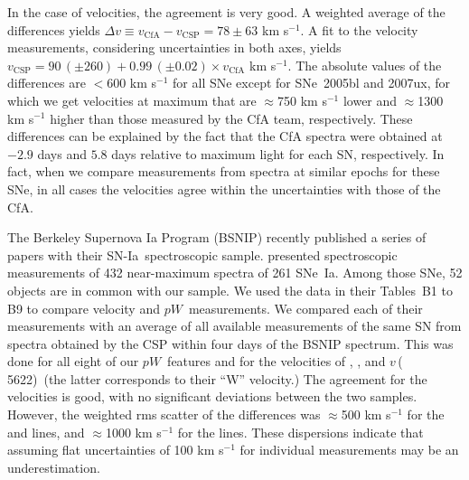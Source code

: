 \documentclass[apj]{emulateapj-rtx4}
\newcommand{\ew}{$pW$}
\newcommand{\vfour}{$v$\,(\ion{S}{2}\,5622)}
\newcommand{\sndia}{SN-Ia}
\newcommand{\sneia}{SNe~Ia}
\begin{document}
In the case of  velocities, the agreement is very good. A
weighted average of the differences yields $\Delta v \equiv
v_{\mathrm{CfA}}-v_{\mathrm{CSP}} = 78 \pm 63$ km s$^{-1}$. A fit to
the velocity measurements, considering uncertainties in both axes,
yields $v_{\mathrm{CSP}}=90\,(\pm 260) + 0.99\,(\pm 0.02) \times
v_{\mathrm{CfA}}$ km s$^{-1}$. The absolute values of the differences
are $<600$ km s$^{-1}$ for all SNe except for SNe~2005bl and 2007ux,
for which we get velocities at maximum that are $\approx$750 km
s$^{-1}$ lower and $\approx$1300 km s$^{-1}$ higher than those
measured by the CfA team, respectively. These differences can be explained by
the fact that the CfA spectra were obtained at $-2.9$ days and $5.8$
days relative to maximum light for each SN, respectively. In fact, when we 
compare measurements from spectra at similar epochs for these SNe, 
in all cases the velocities agree within the uncertainties with those
of the CfA.

The Berkeley Supernova Ia Program (BSNIP) recently published a series
of papers with their \sndia\ spectroscopic sample. \citet{silverman12b}
presented spectroscopic measurements of 432 near-maximum spectra of
261 \sneia. Among those SNe, 52 objects are in common with
our sample. We used the data in their Tables~B1 to B9 to compare
velocity and \ew\ measurements. We compared each of their measurements
with an average of all available measurements of the same SN from spectra
obtained by the CSP within four days of the BSNIP spectrum. This was done
for all eight of our \ew\ features and for the velocities of ,
, and \vfour\ (the latter corresponds to their 
``W'' velocity.) The agreement for the velocities is good, with
no significant deviations between the two samples. However, the weighted rms
scatter of the differences was $\approx$500 km s$^{-1}$ for the
 and  lines, and $\approx$1000 km s$^{-1}$ for
the  lines. These dispersions indicate that assuming
flat uncertainties of 100 km s$^{-1}$ for individual measurements may
be an underestimation.
\end{document}
